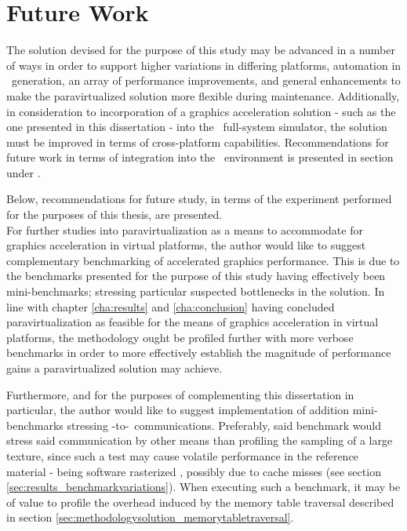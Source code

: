 
\chapter{Future Work}
\label{cha:futurework}
The solution devised for the purpose of this study may be advanced in a number of ways in order to support higher variations in differing platforms, automation in \dvttermabi\ generation, an array of performance improvements, and general enhancements to make the paravirtualized solution more flexible during maintenance.
Additionally, in consideration to incorporation of a graphics acceleration solution - such as the one presented in this dissertation - into the \dvttermsimics\ full-system simulator, the solution must be improved in terms of cross-platform capabilities.
Recommendations for future work in terms of integration into the \dvttermsimics\ environment is presented in section  under .

Below, recommendations for future study, in terms of the experiment performed for the purposes of this thesis, are presented.\\

\noindent
For further studies into paravirtualization as a means to accommodate for graphics acceleration in virtual platforms, the author would like to suggest complementary benchmarking of accelerated graphics performance.
This is due to the benchmarks presented for the purpose of this study having effectively been mini-benchmarks; stressing particular suspected bottlenecks in the solution.
In line with chapter \ref{cha:results} and \ref{cha:conclusion} having concluded paravirtualization as feasible for the means of graphics acceleration in virtual platforms, the methodology ought be profiled further with more verbose benchmarks in order to more effectively establish the magnitude of performance gains a paravirtualized solution may achieve.

Furthermore, and for the purposes of complementing this dissertation in particular, the author would like to suggest implementation of addition mini-benchmarks stressing \dvttermtarget -to-\dvttermhost\ communications.
Preferably, said benchmark would stress said communication by other means than profiling the sampling of a large texture, since such a test may cause volatile performance in the reference material - being software rasterized \dvttermsimics , possibly due to cache misses (see section \ref{sec:results_benchmarkvariations}).
When executing such a benchmark, it may be of value to profile the overhead induced by the memory table traversal described in section \ref{sec:methodologysolution_memorytabletraversal}.\\

